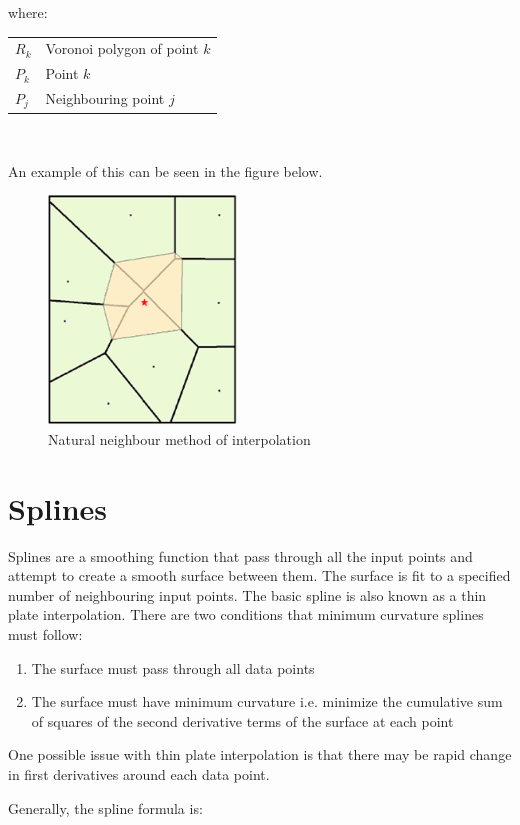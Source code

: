 \documentclass{article}
\makeatletter
\newenvironment{conditions}[1][where:] 
  {#1 \begin{tabular}[t]{>{$}l<{$} @{${}={}$} l}}
  {\end{tabular}\\[\belowdisplayskip]}
\makeatother
\begin{document}
\begin{conditions}
    R_{k} & Voronoi polygon of point $k$ \\
    P_{k} & Point $k$ \\ 
    P_{j} & Neighbouring point $j$
\end{conditions}

An example of this can be seen in the figure below.

\begin{figure}[h]
    \centering
    \label{Natural neighbour method of interpolation}
    \caption{Natural neighbour method of interpolation}
    \includegraphics[width=5cm]{natural-neighbour.png}
\end{figure}

\section{Splines}

Splines are a smoothing function that pass through all the input points and attempt to create a smooth surface between them.
The surface is fit to a specified number of neighbouring input points.
The basic spline is also known as a thin plate interpolation.
There are two conditions that minimum curvature splines must follow:

\begin{enumerate}
    \item The surface must pass through all data points
    \item The surface must have minimum curvature i.e. minimize the cumulative sum of squares of the second derivative terms of the surface at each point
\end{enumerate}

One possible issue with thin plate interpolation is that there may be rapid change in first derivatives around each data point.

Generally, the spline formula is:
\end{document}
